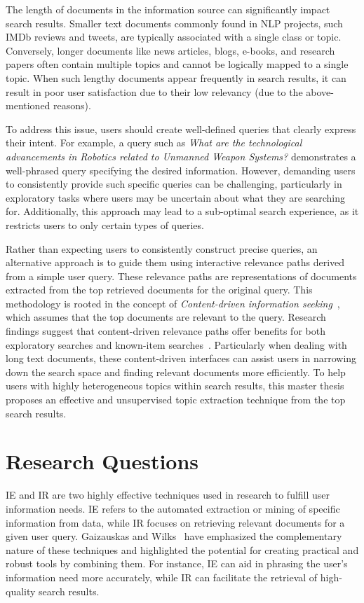 The length of documents in the information source can significantly impact search results. Smaller text documents commonly found in \ac{NLP} projects, such \ac{IMDb} reviews and tweets, are typically associated with a single class or topic. Conversely, longer documents like news articles, blogs, e-books, and research papers often contain multiple topics and cannot be logically mapped to a single topic. When such lengthy documents appear frequently in search results, it can result in poor user satisfaction due to their low relevancy (due to the above-mentioned reasons).


To address this issue, users should create well-defined queries that clearly express their intent. For example, a query such as \emph{What are the technological advancements in Robotics related to Unmanned Weapon Systems?} demonstrates a well-phrased query specifying the desired information. However, demanding users to consistently provide such specific queries can be challenging, particularly in exploratory tasks where users may be uncertain about what they are searching for. Additionally, this approach may lead to a sub-optimal search experience, as it restricts users to only certain types of queries.

Rather than expecting users to consistently construct precise queries, an alternative approach is to guide them using interactive relevance paths derived from a simple user query. These relevance paths are representations of documents extracted from the top retrieved documents for the original query. This methodology is rooted in the concept of \emph{Content-driven information seeking}~\cite{marchionini2007find}, which assumes that the top documents are relevant to the query. Research findings suggest that content-driven relevance paths offer benefits for both exploratory searches and known-item searches~\cite{marchionini2007find}. Particularly when dealing with long text documents, these content-driven interfaces can assist users in narrowing down the search space and finding relevant documents more efficiently. To help users with highly heterogeneous topics within search results, this master thesis proposes an effective and unsupervised topic extraction technique from the top search results.
 
\section{Research Questions}

\ac{IE} and \ac{IR} are two highly effective techniques used in research to fulfill user information needs. \ac{IE} refers to the automated extraction or mining of specific information from data, while IR focuses on retrieving relevant documents for a given user query. Gaizauskas and Wilks~\cite{gaizauskas1998information} have emphasized the complementary nature of these techniques and highlighted the potential for creating practical and robust tools by combining them. For instance, \ac{IE} can aid in phrasing the user's information need more accurately, while IR can facilitate the retrieval of high-quality search results.
 
